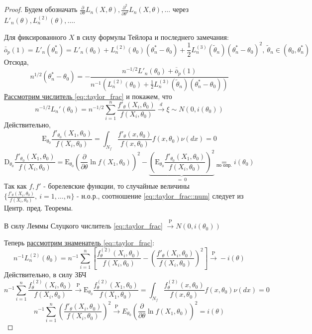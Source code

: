 \documentclass[12pt]{article}
\theoremstyle{basic_theorem}
\theoremstyle{name_theorem}
\def\E{
    \mathrm{E}
}
\def\D{
    \mathrm{D}
}
\def\P{
    \mathrm{P}
}
\def\littleO{
    \overline{\overline{o}}
}
\begin{document}
    \begin{proof}
        Будем обозначать $\frac{\partial}{\partial\theta}L_n(X, \theta), \frac{\partial^2}{\partial\theta^2}L_n(X, \theta), \ldots$
        через $L'_n(\theta), L^{(2)}_n(\theta), \ldots$.

        Для фиксированного $X$ в силу формулы Тейлора и последнего замечания:
        $$\littleO_p(1) = L'_n(\theta^*_n) = L'_n(\theta_0) + L^{(2)}_n(\theta_0)(\theta^*_n - \theta_0) + 
        \frac{1}{2}L_n^{(3)}(\widetilde{\theta}_n)(\theta^*_n - \theta_0)^2,\ \widetilde{\theta}_n \in(\theta_0, \theta_n^*)$$
        Отсюда,
        \begin{equation}
            \label{eq::taylor_frac}
            n^{1/2}(\theta^*_n - \theta_0) = -\frac{n^{-1/2} L'_n(\theta_0) + \littleO_p(1)}{n^{-1}(L^{(2)}_n(\theta_0) + \frac{1}{2}L^{(3)}_n(\widetilde{\theta}_n)(\theta^*_n - \theta_0))}
        \end{equation}
        \underline{Рассмотрим числитель \eqref{eq::taylor_frac}} и покажем, что
        \begin{equation}
            \label{eq::taylor_frac::num}
            n^{-1/2}L_n'(\theta_0) = n^{-1/2}\sum_{i=1}^n \frac{f'_\theta(X_i, \theta_0)}{f(X_i, \theta_0)} \xrightarrow{d} \xi\sim N(0, i(\theta_0))
        \end{equation}
        Действительно, 
        $$\E_{\theta_0}\frac{f'_{\theta_0}(X_1, \theta_0)}{f(X_i, \theta_0)} = \int_{N_f}\frac{f'_\theta(x, \theta_0)}{f(x,\theta_0)} f(x,\theta_0) \nu(dx) = 0$$
        $$\D_{\theta_0}\frac{f'_{\theta_0}(X_1, \theta_0)}{f(X_i, \theta_0)} = \E_{\theta_0}\left(\frac{\partial}{\partial\theta}\ln f(X_1, \theta_0)\right)^2 - \underbrace{\left(\E_{\theta_0}\frac{f'_{\theta_0}(X_1, \theta_0)}{f(X_i, \theta_0)}\right)^2 }_{ =\ 0} \underset{\text{по опр.}}{=} i(\theta_0)$$
        Так как $f, f'$ - борелевские функции, то случайные величины $\{\frac{f'_\theta(X_i, \theta_0)}{f(X_i, \theta_0)},\ i=1,\ldots,n\}$ - н.о.р.,
        соотношение \eqref{eq::taylor_frac::num} следует из Центр. пред. Теоремы.
        
        В силу Леммы Слуцкого числитель \eqref{eq::taylor_frac} $\xrightarrow{\P} N(0, i(\theta_0))$

        Теперь \underline{рассмотрим знаменатель \eqref{eq::taylor_frac}}:
        \begin{equation}
            \label{eq::taylor_frac::den}
            n^{-1}L_n^{(2)}(\theta_0) = n^{-1}\sum^n_{i=1}\left[ \frac{f^{(2)}_\theta(X_i, \theta_0)}{f(X_i, \theta_0)} - \left(\frac{f'_\theta(X_i, \theta_0)}{f(X_i, \theta_0)}\right)^2\right] \xrightarrow{\P} -i(\theta)
        \end{equation}
        Действительно, в силу ЗБЧ
        $$n^{-1}\sum^n_{i=1} \frac{f^{(2)}_\theta(X_i, \theta_0)}{f(X_i, \theta_0)} \xrightarrow{\P} \E_{\theta_0}\frac{f^{(2)}_\theta(X_1, \theta_0)}{f(X_1, \theta_0)} = \int_{N_f} \frac{f^{(2)}_\theta(x, \theta_0)}{f(x, \theta_0)} f(x, \theta_0) \nu(dx) = 0$$
        $$n^{-1}\sum^n_{i=1} \left(\frac{f'_\theta(X_i, \theta_0)}{f(X_i, \theta_0)}\right)^2 \xrightarrow{\P} E_{\theta_0} \left(\frac{\partial}{\partial\theta} \ln f(X_1, \theta_0)\right)^2 = i(\theta)$$
    

\end{proof}
\end{document}
